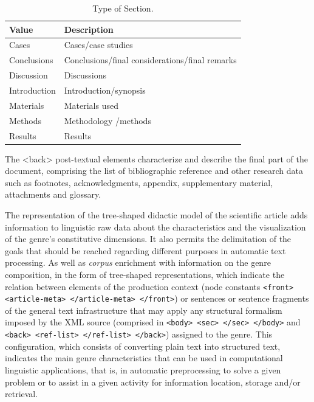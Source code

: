 \documentclass[english]{textolivre}
\begin{document}
\begin{table}[htbp]
\begin{center}
\caption{Type of Section.}
\label{tbl02}
\begin{tabular}{ll}
\hline 
\textbf{Value}        & \textbf{Description}                                    \\
\hline
Cases        & Cases/case studies                             \\
Conclusions  & Conclusions/final considerations/final remarks \\
Discussion   & Discussions                                    \\
Introduction & Introduction/synopsis                          \\
Materials    & Materials used                                 \\
Methods      & Methodology /methods                           \\
Results      & Results                                        \\ \hline
\end{tabular}
\end{center}
\end{table}

The <back> post-textual elements characterize and describe the final part of the document, comprising the list of bibliographic reference and other research data such as footnotes, acknowledgments, appendix, supplementary material, attachments and glossary.

The representation of the tree-shaped didactic model of the scientific article adds information to linguistic raw data about the characteristics and the visualization of the genre’s constitutive dimensions. It also permits the delimitation of the goals that should be reached regarding different purposes in automatic text processing. As well as \textit{corpus} enrichment with information on the genre composition, in the form of tree-shaped representations, which indicate the relation between elements of the production context (node constants \texttt{<front> <article-meta> </article-meta> </front>}) or sentences or sentence fragments of the general text infrastructure that may apply any structural formalism imposed by the XML source (comprised in \texttt{<body> <sec> </sec> </body>} and \texttt{<back> <ref-list> </ref-list> </back>}) assigned to the genre. This configuration, which consists of converting plain text into structured text, indicates the main genre characteristics that can be used in computational linguistic applications, that is, in automatic preprocessing to solve a given problem or to assist in a given activity for information location, storage and/or retrieval.
\end{document}
